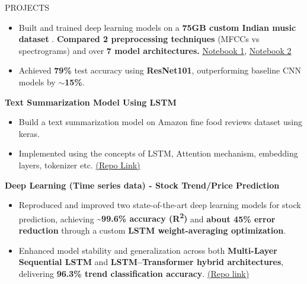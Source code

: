 \documentclass{resume} %
\begin{document}
\begin{rSection}{PROJECTS}
\begin{itemize}
     \item Built and trained deep learning models on a \textbf{75GB custom Indian music dataset} . \textbf{Compared 2 preprocessing techniques} (MFCCs vs spectrograms) and over \textbf{7 model architectures.} \href{https://www.kaggle.com/code/mulyapatel/indian-music-genre-prediction-mel}{Notebook 1}, \href{https://www.kaggle.com/code/mulyapatel/indian-music-genre-prediction-mfcc}{Notebook 2}
      \vspace{-1.8em}
     \item Achieved \textbf{79\%} test accuracy using \textbf{ResNet101}, outperforming baseline CNN models by \textbf{\(\sim \)15\%}.

\vspace{-0.5em}

      

\end{itemize}

\item \textbf{Text Summarization Model Using LSTM}
 \begin{itemize}
 \vspace{-0.25em}
    \item Build a text summarization model on Amazon fine food reviews dataset using keras.
    \vspace{-0.25em}
    \item Implemented using the
concepts of LSTM, Attention mechanism, embedding
layers, tokenizer etc. \href{https://github.com/MulyaP/Text-Summarization}{(Repo Link)}
\vspace{-0.25em}
 \end{itemize}

\item \textbf{Deep Learning (Time series data) - Stock Trend/Price Prediction}

\begin{itemize}
\vspace{-0.5em}
    \item Reproduced and improved two state-of-the-art deep learning models for stock prediction, achieving \textbf{\textasciitilde99.6\% accuracy (R\textsuperscript{2})} and \textbf{about 45\% error reduction} through a custom \textbf{LSTM weight-averaging optimization}.
    \vspace{-0.5em}
    \vspace{-0.25em}
    \vspace{-0.5em}
    \vspace{-0.5em}
    \item Enhanced model stability and generalization across both \textbf{Multi-Layer Sequential LSTM} and \textbf{LSTM--Transformer hybrid architectures}, delivering \textbf{96.3\% trend classification accuracy}. \href{https://github.com/MulyaP/Stock-Trend-Prediction}{(Repo link)}
    \vspace{-0.5em}
\end{itemize}




\end{rSection}
\end{document}
